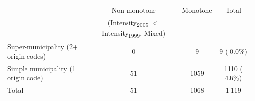 \begin{tabular}{lccc} \hline \hline
& Non-monotone & Monotone & Total \\ 
& (Intensity{\textsubscript{2005}} $<$ Intensity{\textsubscript{1999}}, Mixed) & & \\ \toprule
Super-municipality (2+ origin codes) & 0 & 9 & 9 ( 0.0\%) \\ 
Simple municipality (1 origin code) & 51 & 1059 & 1110 ( 4.6\%) \\ 
\bottomrule
Total & 51 & 1068 & 1,119 \\ 
\end{tabular}
